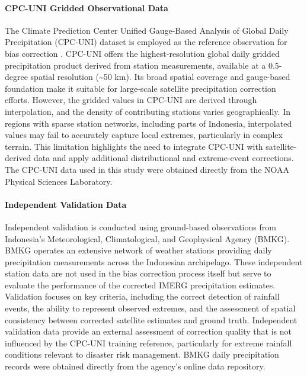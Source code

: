 \documentclass[remotesensing,article,submit,pdftex,moreauthors]{Definitions/mdpi}
\begin{document}
\paragraph{CPC-UNI Gridded Observational
Data}\label{cpc-uni-gridded-observational-data}

The Climate Prediction Center Unified Gauge-Based Analysis of Global
Daily Precipitation (CPC-UNI) dataset is employed as the reference
observation for bias correction \cite{ref13,ref18}. CPC-UNI offers the
highest-resolution global daily gridded precipitation product derived
from station measurements, available at a 0.5-degree spatial resolution
(\textasciitilde50 km). Its broad spatial coverage and gauge-based
foundation make it suitable for large-scale satellite precipitation
correction efforts. However, the gridded values in CPC-UNI are derived
through interpolation, and the density of contributing stations varies
geographically. In regions with sparse station networks, including parts
of Indonesia, interpolated values may fail to accurately capture local
extremes, particularly in complex terrain. This limitation highlights
the need to integrate CPC-UNI with satellite-derived data and apply
additional distributional and extreme-event corrections. The CPC-UNI
data used in this study were obtained directly from the NOAA Physical
Sciences Laboratory.

\paragraph{Independent Validation
Data}\label{independent-validation-data}

Independent validation is conducted using ground-based observations from
Indonesia's Meteorological, Climatological, and Geophysical Agency
(BMKG). BMKG operates an extensive network of weather stations providing
daily precipitation measurements across the Indonesian archipelago.
These independent station data are not used in the bias correction
process itself but serve to evaluate the performance of the corrected
IMERG precipitation estimates. Validation focuses on key criteria,
including the correct detection of rainfall events, the ability to
represent observed extremes, and the assessment of spatial consistency
between corrected satellite estimates and ground truth. Independent
validation data provide an external assessment of correction quality
that is not influenced by the CPC-UNI training reference, particularly
for extreme rainfall conditions relevant to disaster risk management.
BMKG daily precipitation records were obtained directly from the
agency's online data repository.
\end{document}
